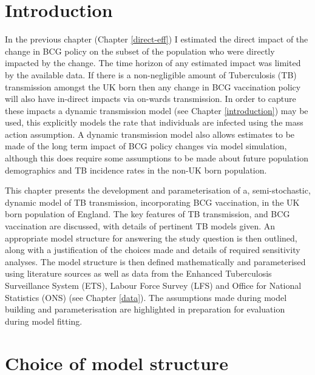 \documentclass[11pt,twoside]{bristolthesis}
\begin{document}
  \hypertarget{introduction-6}{%
  \section{Introduction}\label{introduction-6}}
  
  In the previous chapter (Chapter \ref{direct-eff}) I estimated the direct impact of the change in BCG policy on the subset of the population who were directly impacted by the change. The time horizon of any estimated impact was limited by the available data. If there is a non-negligible amount of Tuberculosis (TB) transmission amongst the UK born then any change in BCG vaccination policy will also have in-direct impacts via on-wards transmission. In order to capture these impacts a dynamic transmission model (see Chapter \ref{introduction}) may be used, this explicitly models the rate that individuals are infected using the mass action assumption. A dynamic transmission model also allows estimates to be made of the long term impact of BCG policy changes via model simulation, although this does require some assumptions to be made about future population demographics and TB incidence rates in the non-UK born population.
  
  This chapter presents the development and parameterisation of a, semi-stochastic, dynamic model of TB transmission, incorporating BCG vaccination, in the UK born population of England. The key features of TB transmission, and BCG vaccination are discussed, with details of pertinent TB models given. An appropriate model structure for answering the study question is then outlined, along with a justification of the choices made and details of required sensitivity analyses. The model structure is then defined mathematically and parameterised using literature sources as well as data from the Enhanced Tuberculosis Surveillance System (ETS), Labour Force Survey (LFS) and Office for National Statistics (ONS) (see Chapter \ref{data}). The assumptions made during model building and parameterisation are highlighted in preparation for evaluation during model fitting.
  
  \hypertarget{model-just}{%
  \section{Choice of model structure}\label{model-just}}
  
\end{document}
